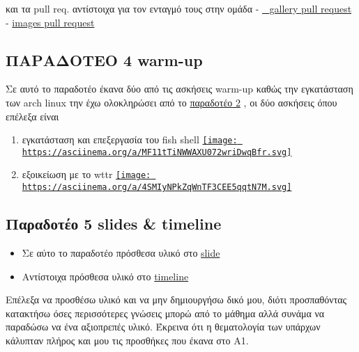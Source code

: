 \documentclass[
]{article}
\providecommand{\tightlist}{%
  \setlength{\itemsep}{0pt}\setlength{\parskip}{0pt}}
\begin{document}
και τα pull req. αντίστοιχα για τον ενταγμό τους στην ομάδα -
\href{https://github.com/Second-Time-Is-The-Charm/_gallery/pull/5\#event-7645248395}{\_gallery
pull request} -
\href{https://github.com/Second-Time-Is-The-Charm/images/pull/5\#issuecomment-1287660118}{images
pull request}

\hypertarget{ux3c0ux3b1ux3c1ux3b1ux3b4ux3bfux3c4ux3b5ux3bf-4-warm-up}{%
\subsection{ΠΑΡΑΔΟΤΕΟ 4 \textbar{}
warm-up}\label{ux3c0ux3b1ux3c1ux3b1ux3b4ux3bfux3c4ux3b5ux3bf-4-warm-up}}

Σε αυτό το παραδοτέο έκανα δύο από τις ασκήσεις warm-up καθώς την
εγκατάσταση των arch linux την έχω ολοκληρώσει από το
\href{https://github.com/courses-ionio/help/discussions/1092}{παραδοτέο
2} , οι δύο ασκήσεις όπου επέλεξα είναι

\begin{enumerate}
\def\labelenumi{\arabic{enumi}.}
\tightlist
\item
  εγκατάσταση και επεξεργασία του fish shell
  \href{https://asciinema.org/a/MF11tTiNWWAXU072wriDwqBfr}{\texttt{[image: https://asciinema.org/a/MF11tTiNWWAXU072wriDwqBfr.svg]}}
\item
  εξοικείωση με το wttr
  \href{https://asciinema.org/a/4SMIyNPkZqWnTF3CEE5qqtN7M}{\texttt{[image: https://asciinema.org/a/4SMIyNPkZqWnTF3CEE5qqtN7M.svg]}}
\end{enumerate}

\hypertarget{ux3c0ux3b1ux3c1ux3b1ux3b4ux3bfux3c4ux3adux3bf-5-slides-timeline}{%
\subsection{Παραδοτέο 5 \textbar{} slides \&
timeline}\label{ux3c0ux3b1ux3c1ux3b1ux3b4ux3bfux3c4ux3adux3bf-5-slides-timeline}}

\begin{itemize}
\tightlist
\item
  Σε αύτο το παραδοτέο πρόσθεσα υλικό στο
  \href{https://github.com/Second-Time-Is-The-Charm/site/blob/master/_slides/os.md}{slide}
\item
  Αντίστοιχα πρόσθεσα υλικό στο
  \href{https://github.com/Second-Time-Is-The-Charm/site/blob/master/_timeline/os-apps.md}{timeline}
\end{itemize}

Επέλεξα να προσθέσω υλικό και να μην δημιουργήσω δικό μου, διότι
προσπαθόντας κατακτήσω όσες περισσότερες γνώσεις μπορώ από το μάθημα
αλλά συνάμα να παραδώσω να ένα αξιοπρεπές υλικό. Έκρεινα ότι η
θεματολογία των υπάρχων κάλυπταν πλήρος και μου τις προσθήκες που έκανα
στο A1.
\end{document}
